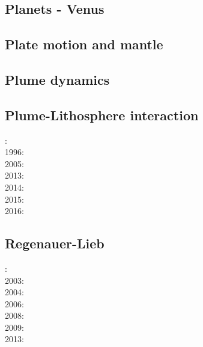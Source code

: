 \subsection*{Planets - Venus}

\cite{scbg90}
\cite{kiha92}
\cite{somo96}
\cite{mazk98}\cite{moso98}
\cite{vavv05}
\cite{arta12}
\cite{cram17}\cite{dast17}
\cite{king18}



\subsection*{Plate motion and mantle}

\noindent
\cite{zieg92a}
\cite{zhgm98}
\cite{lizh09}
\cite{huss12}
\cite{yoha15}

\subsection*{Plume dynamics}

\noindent
\cite{nasf94}\cite{hayu94}
\cite{lays99}
\cite{isst06}
\cite{toyu11}\cite{talz11}\cite{burk11}
\cite{dagm13}
\cite{daso15}
\cite{dacc18}

\subsection*{Plume-Lithosphere interaction}

: \cite{rich94}\\
1996: \cite{zhgm96}\\
2005: \cite{bugu05}\\
2013: \cite{bemm13}\cite{brps13}\\
2014: \cite{buge14}\\
2015: \cite{gesb15}\cite{kocb15}\\
2016: \cite{fige16}

\subsection*{Regenauer-Lieb}

: \cite{reyu00}\\
2003: \cite{reyu03}\\
2004: \cite{reyu04}\\
2006: \cite{rehy06}\cite{rewr06}\\
2008: \cite{rerw08}\\
2009: \cite{reps09}\\
2013: \cite{revp13}

